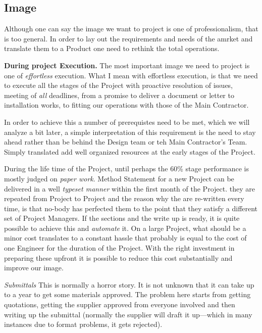 \subsection*{Image}

Although one can say the image we want to project is one of professionalism, that is too general. In order to lay out the requirements and needs of the amrket and translate them to a Product one need to rethink the total operations.

\textbf{During project Execution.}\quad
The most important image we need to project is one of \textit{effortless} execution. What I mean with effortless execution, is that we need to execute all the stages of the Project with proactive resolution of issues, meeting of \textit{all} deadlines, from a promise to deliver a document or letter to installation works, to fitting our operations with those of the Main Contractor.

In order to achieve this a number of prerequistes need to be met, which we will analyze a bit later, a simple interpretation of this requirement is the need to stay ahead rather than be behind the Design team or teh Main Contractor's Team. Simply translated add well organized resources at the early stages of the Project.

\quad During the life time of the Project, until perhaps the 60\% stage performance is mostly judged on \textit{paper work}. Method Statement for a new Project can be delivered in a well \textit{typeset manner} within the first month of the Project. they are repeated from Project to Project and the reason why the are re-written every time, is that no-body has perfected them to the point that they satisfy a different set of Project Managers. If the sections and the write up is ready, it is quite possible to achieve this and \textit{automate} it. On a large Project, what should be a minor cost translates to a constant hassle that probably is equal to the cost of one Engineer for the duration of the Project. With the right investment in preparing these upfront it is possible to reduce this cost substantially and improve our image. 

\textit{Submittals}\quad
This is normally a horror story. It is not unknown that it can take up to a year to get some materials approved. The problem here starts from getting quotations, getting the supplier approved from everyone involved and then writing up the submittal (normally the supplier will draft it up---which in many instances due to format problems, it gets rejected). 

